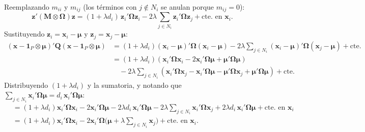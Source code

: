 \documentclass[11pt,a4paper]{article}
\begin{document}
Reemplazando $m_{ii}$ y $m_{ij}$ (los términos con $j\notin N_i$ se anulan porque $m_{ij}=0$):
\[
\boldsymbol{z}'(\mathbf{M}\otimes\mathbf{\Omega})\boldsymbol{z}
=(1+\lambda d_i)\,\boldsymbol{z}_i'\mathbf{\Omega}\boldsymbol{z}_i
-2\lambda\sum_{j\in N_i}\boldsymbol{z}_i'\mathbf{\Omega}\boldsymbol{z}_j
+\text{cte. en }\boldsymbol{x}_i .
\]
Sustituyendo $\boldsymbol{z}_i=\boldsymbol{x}_i-\boldsymbol{\mu}$ y $\boldsymbol{z}_j=\boldsymbol{x}_j-\boldsymbol{\mu}$:
\begin{align*}
(\boldsymbol{x}-\boldsymbol{1}_P\otimes\boldsymbol{\mu})'\mathbf{Q}(\boldsymbol{x}-\boldsymbol{1}_P\otimes\boldsymbol{\mu})
&=(1+\lambda d_i)(\boldsymbol{x}_i-\boldsymbol{\mu})'\mathbf{\Omega}(\boldsymbol{x}_i-\boldsymbol{\mu})
-2\lambda\sum_{j\in N_i}(\boldsymbol{x}_i-\boldsymbol{\mu})'\mathbf{\Omega}(\boldsymbol{x}_j-\boldsymbol{\mu})
+\text{cte.}\\
&=(1+\lambda d_i)\left(\boldsymbol{x}_i'\mathbf{\Omega}\boldsymbol{x}_i-2\boldsymbol{x}_i'\mathbf{\Omega}\boldsymbol{\mu}+\boldsymbol{\mu}'\mathbf{\Omega}\boldsymbol{\mu}\right)\\
&\quad-2\lambda\sum_{j\in N_i}\left(\boldsymbol{x}_i'\mathbf{\Omega}\boldsymbol{x}_j-\boldsymbol{x}_i'\mathbf{\Omega}\boldsymbol{\mu}-\boldsymbol{\mu}'\mathbf{\Omega}\boldsymbol{x}_j+\boldsymbol{\mu}'\mathbf{\Omega}\boldsymbol{\mu}\right)+\text{cte.}
\end{align*}
Distribuyendo $(1+\lambda d_i)$ y la sumatoria, y notando que $\sum_{j\in N_i}\boldsymbol{x}_i'\mathbf{\Omega}\boldsymbol{\mu}=d_i\,\boldsymbol{x}_i'\mathbf{\Omega}\boldsymbol{\mu}$:
\begin{align*}
&=(1+\lambda d_i)\boldsymbol{x}_i'\mathbf{\Omega}\boldsymbol{x}_i
-2\boldsymbol{x}_i'\mathbf{\Omega}\boldsymbol{\mu}
-2\lambda d_i\,\boldsymbol{x}_i'\mathbf{\Omega}\boldsymbol{\mu}
-2\lambda\sum_{j\in N_i}\boldsymbol{x}_i'\mathbf{\Omega}\boldsymbol{x}_j
+2\lambda d_i\,\boldsymbol{x}_i'\mathbf{\Omega}\boldsymbol{\mu}
+\text{cte. en }\boldsymbol{x}_i\\
&=(1+\lambda d_i)\boldsymbol{x}_i'\mathbf{\Omega}\boldsymbol{x}_i
-2\boldsymbol{x}_i'\mathbf{\Omega}\Big(\boldsymbol{\mu}+\lambda\sum_{j\in N_i}\boldsymbol{x}_j\Big)
+\text{cte. en }\boldsymbol{x}_i .
\end{align*}
\end{document}
